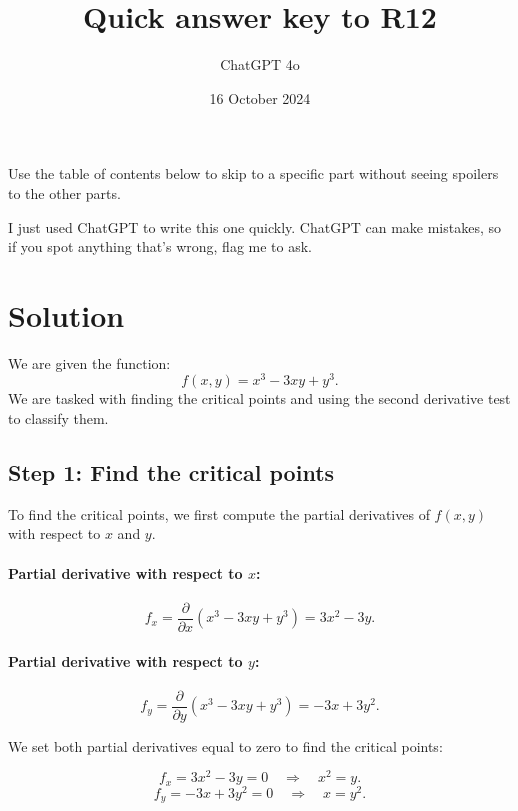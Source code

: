 \documentclass[11pt]{article}
\begin{document}
\title{Quick answer key to R12}
\author{ChatGPT 4o}
\date{16 October 2024}
\maketitle

Use the table of contents below to skip to a specific part
without seeing spoilers to the other parts.

I just used ChatGPT to write this one quickly.
ChatGPT can make mistakes, so if you spot anything that's wrong, flag me to ask.

\tableofcontents



\newpage

\section{Solution}

We are given the function:
\[
f(x, y) = x^3 - 3xy + y^3.
\]
We are tasked with finding the critical points and using the second derivative test to classify them.

\newpage

\subsection{Step 1: Find the critical points}

To find the critical points, we first compute the partial derivatives of \( f(x, y) \) with respect to \( x \) and \( y \).

\paragraph{Partial derivative with respect to \( x \):}
\[
f_x = \frac{\partial}{\partial x} \left( x^3 - 3xy + y^3 \right) = 3x^2 - 3y.
\]

\paragraph{Partial derivative with respect to \( y \):}
\[
f_y = \frac{\partial}{\partial y} \left( x^3 - 3xy + y^3 \right) = -3x + 3y^2.
\]

We set both partial derivatives equal to zero to find the critical points:

\[
f_x = 3x^2 - 3y = 0 \quad \Rightarrow \quad x^2 = y.
\]
\[
f_y = -3x + 3y^2 = 0 \quad \Rightarrow \quad x = y^2.
\]

\newpage
\end{document}
